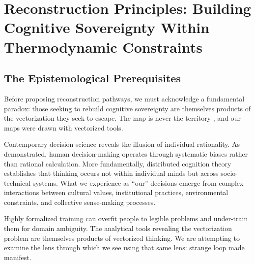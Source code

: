 %

\section{Reconstruction Principles: Building Cognitive Sovereignty Within Thermodynamic Constraints}
\label{sec:reconstruction}

\subsection{The Epistemological Prerequisites}

Before proposing reconstruction pathways, we must acknowledge a fundamental paradox: those seeking to rebuild cognitive sovereignty are themselves products of the vectorization they seek to escape. The map is never the territory \citep{korzybski1933}, and our maps were drawn with vectorized tools.

Contemporary decision science reveals the illusion of individual rationality. As \citet{kahneman2011} demonstrated, human decision-making operates through systematic biases rather than rational calculation. More fundamentally, distributed cognition theory \citep{hutchins1995} establishes that thinking occurs not within individual minds but across socio-technical systems. What we experience as ``our'' decisions emerge from complex interactions between cultural values, institutional practices, environmental constraints, and collective sense-making processes.

Highly formalized training can overfit people to legible problems and under-train them for domain ambiguity. The analytical tools revealing the vectorization problem are themselves products of vectorized thinking. We are attempting to examine the lens through which we see using that same lens: \citet{hofstadter1979} strange loop made manifest.

